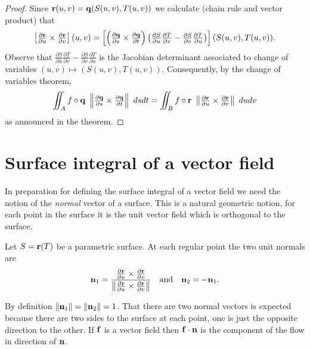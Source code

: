 \begin{proof}
    Since \(\mathbf{r}(u,v) = \mathbf{q}(S(u,v),T(u,v))\) we calculate (chain rule and vector product) that
    \[
        \left[\tfrac{\partial \mathbf{r}}{\partial u} \times  \tfrac{\partial \mathbf{r}}{\partial v}\right]
        (u,v)
        =
        \left[
        \left(\tfrac{\partial \mathbf{q}}{\partial s} \times \tfrac{\partial \mathbf{q}}{\partial t}\right)
        \left(\tfrac{\partial S}{\partial u} \tfrac{\partial T}{\partial v} -  \tfrac{\partial S}{\partial v} \tfrac{\partial T}{\partial u} \right)  \right]
        (S(u,v),T(u,v)).
    \]
    Observe that \(\frac{\partial S}{\partial u} \frac{\partial T}{\partial v} -  \frac{\partial S}{\partial v} \frac{\partial T}{\partial u}\) is the Jacobian determinant associated to change of variables \((u,v) \mapsto  (S(u,v),T(u,v)) \).
    Consequently, by the change of variables theorem,
    \[
        \iint_{A} f \circ \mathbf{q} \ \norm{\tfrac{\partial  \mathbf{q} }{\partial s} \times \tfrac{\partial  \mathbf{q} }{\partial t}} \ ds dt
        =
        \iint_{B} f \circ \mathbf{r} \  \norm{\tfrac{\partial  \mathbf{r} }{\partial u} \times \tfrac{\partial  \mathbf{r} }{\partial v}} \ du dv
    \]
    as announced in the theorem.
\end{proof}



\section{Surface integral of a vector field}

In preparation for defining the surface integral of a vector field we need the notion of the \emph{normal} vector of a surface.
This is a natural geometric notion, for each point in the surface it is the unit vector field which is orthogonal to the surface.

\begin{definition}
    Let \(S=\mathbf{r}(T)\) be a parametric surface.
    At each regular point the two unit normals are
    \[
        \mathbf{n}_1 = \frac{\frac{\partial  \mathbf{r} }{\partial u} \times \frac{\partial  \mathbf{r} }{\partial v}}{\left\|\frac{\partial  \mathbf{r} }{\partial u} \times \frac{\partial  \mathbf{r} }{\partial v}\right\|}
        \quad \text{and} \quad
        \mathbf{n}_2 = -\mathbf{n}_1.
    \]
\end{definition}

By definition \(\left\|\mathbf{n}_1\right\| = \left\|\mathbf{n}_2\right\| = 1\).
That there are two normal vectors is expected because there are two sides to the surface at each point, one is just the opposite direction to the other.
If \(\mathbf{f}\) is a vector field then \(\mathbf{f} \cdot \mathbf{n}\) is the component of the flow in direction of \(\mathbf{n}\).

